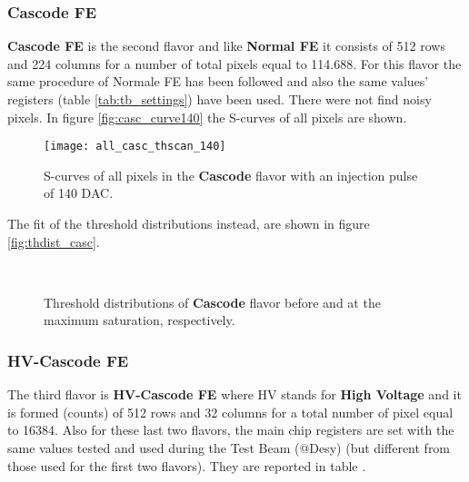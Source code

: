 \subsubsection{Cascode FE}

\textbf{Cascode FE} is the second flavor and like \textbf{Normal FE} it consists of 512 rows and 224 columns for a number of total pixels equal to 114.688. For this flavor the same procedure of Normale FE has been followed and also the same values' registers (table \vref{tab:tb_settings}) have been used. There were not find noisy pixels. 
In figure \vref{fig:casc_curve140} the S-curves of all pixels are shown.

\begin{figure}[h!]
\centering
\texttt{[image: all\_casc\_thscan\_140]}
\caption{S-curves of all pixels in the \textbf{Cascode} flavor with an injection pulse of 140 DAC.}
\label{fig:casc_scurve140}
\end{figure}

The fit of the threshold distributions instead, are shown in figure \vref{fig:thdist_casc}.

\begin{figure}[h!]
\centering
{}\quad
{}\\
\caption{Threshold distributions of \textbf{Cascode} flavor before and at the maximum saturation, respectively.}
\label{fig:thdist_casc}
\end{figure}


\subsubsection{HV-Cascode FE}

The third flavor is \textbf{HV-Cascode FE} where HV stands for \textbf{High Voltage} and it is formed (counts) of 512 rows and 32 columns for a total number of pixel equal to 16384. Also for these last two flavors, the main chip registers are set with the same values tested and used during the Test Beam (@Desy) (but different from those used for the first two flavors). They are reported in table  .

